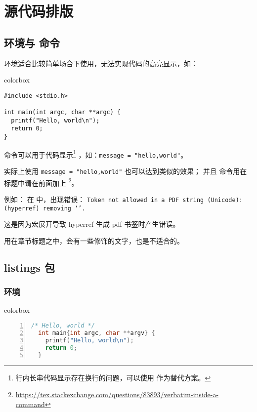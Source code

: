 \chapter{源代码排版}

\section{\protect{} 环境与 \protect{} 命令}

 环境适合比较简单场合下使用，无法实现代码的高亮显示，如：

\begin{latexcode}{colorbox}
\begin{verbatim}
#include <stdio.h>

int main(int argc, char **argc) {
  printf("Hello, world\n");
  return 0;
}
\end{verbatim}
\end{latexcode}

 命令可以用于代码显示\footnote{行内长串代码显示存在换行的问题，可以使用  作为替代方案。}
，如：\texttt{\verb|message = "hello,world"|}。

实际上使用 \texttt{{\tffamily message = "hello,world"}} 也可以达到类似的效果；
并且  命令用在标题中请在前面加上 
\footnote{\url{https://tex.stackexchange.com/questions/83893/verbatim-inside-a-command}}。

例如： 在   中，出现错误：
\texttt{Token not allowed in a PDF string (Unicode): (hyperref) removing `\new@ifnextchar'.} 

这是因为宏展开导致 hyperref 生成 pdf 书签时产生错误。

\begin{remark*}
 用在章节标题之中，会有一些修饰的文字，也是不适合的。
\end{remark*}

\section{listings 包}

\subsection{\protect{} 环境}

\begin{latexcode}{colorbox}
\begin{lstlisting}[language=C,caption={C/C++ 语言},numbers=left]
  /* Hello, world */
  int main{int argc, char **argv} {
    printf("Hello, world\n");
    return 0;
  }
\end{lstlisting}
\end{latexcode}

